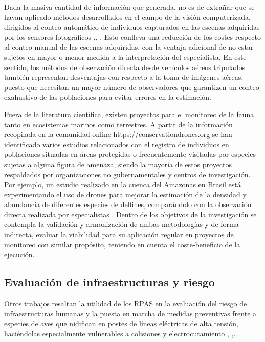 \documentclass[11pt,]{article}
\begin{document}
Dada la masiva cantidad de información que generada, no es de extrañar
que se hayan aplicado métodos desarrollados en el campo de la visión
computerizada, dirigidos al conteo automático de individuos capturados
en las escenas adquiridas por los sensores fotográficos
\citep{Lhoest2015},\citep{Abd-Elrahman2005a}, \citep{VanGemert2015}.
Esto conlleva una reducción de los costes respecto al conteo manual de
las escenas adquiridas, con la ventaja adicional de no estar sujetos en
mayor o menor medida a la interpretación del especialista. En este
sentido, los métodos de observación directa desde vehículos aéreos
tripulados también representan desventajas con respecto a la toma de
imágenes aéreas, puesto que necesitan un mayor número de observadores
que garantizen un conteo exahustivo de las poblaciones para evitar
errores en la estimación.

Fuera de la literatura científica, existen proyectos para el monitoreo
de la fauna tanto en ecosistemas marinos como terrestres. A partir de la
información recopilada en la comunidad online
\url{https://conservationdrones.org} se han identificado varios estudios
relacionados con el registro de individuos en poblaciones situadas en
áreas protegidas o frecuentemente visitadas por especies sujetas a
alguna figura de amenaza, siendo la mayoría de estos proyectos
respaldados por organizaciones no gubernamentales y centros de
investigación. Por ejemplo, un estudio realizado en la cuenca del
Amazonas en Brasil está experimentando el uso de drones para mejorar la
estimación de la densidad y abundancia de diferentes especies de
delfines, comparándolo con la observación directa realizada por
especialistas \citep{WichS2017}. Dentro de los objetivos de la
investigación se contempla la validación y armonización de ambas
metodologías y de forma indirecta, evaluar la viabilidad para su
aplicación regular en proyectos de monitoreo con similar propósito,
teniendo en cuenta el coste-beneficio de la ejecución.

\subsection{Evaluación de infraestructuras y
riesgo}\label{evaluacion-de-infraestructuras-y-riesgo}

Otros trabajos resaltan la utilidad de los RPAS en la evaluación del
riesgo de infraestructuras humanas y la puesta en marcha de medidas
preventivas frente a especies de aves que nidifican en postes de líneas
eléctricas de alta tensión, haciéndolas especialmente vulnerables a
colisiones y electrocutamiento \citep{Mulero-Pazmany2014a},
\citep{Zhang2016},\citep{Lobermeier2015}.
\end{document}
